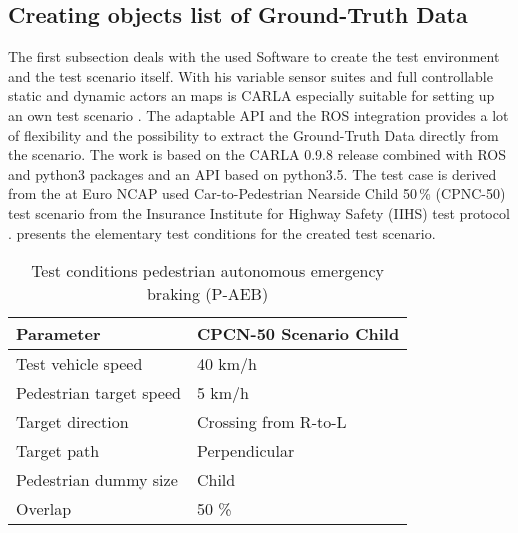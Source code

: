 
\subsection{Creating objects list of Ground-Truth Data}
The first subsection deals with the used Software to create the test environment and the test scenario itself. With his variable sensor suites and full controllable static and dynamic actors an maps is CARLA especially suitable for setting up an own test scenario \cite{Dosovitskiy17}. The adaptable \ac{API} and the \ac{ROS} integration provides a lot of flexibility and the possibility to extract the Ground-Truth Data directly from the scenario. The work is based on the CARLA 0.9.8 release combined with \ac{ROS} and python3 packages and an \ac{API} based on python3.5. The test case is derived from the at Euro NCAP used Car-to-Pedestrian Nearside Child 50\,\% (CPNC-50) test scenario from the Insurance Institute for Highway Safety (IIHS) test protocol \cite{NCAP, Protocoll}.  presents the elementary test conditions for the created test scenario. %


\begin{table}[h]
	\caption{Test conditions pedestrian autonomous emergency braking (P-AEB) \cite{Protocoll}}
	\label{Test conditions}
	\begin{center}
		\begin{tabular}{l l}
			\hline
			Parameter & CPCN-50 Scenario Child\\
			\hline
			Test vehicle speed & 40 km/h\\
			Pedestrian target speed & 5 km/h\\
			Target direction        & Crossing from R-to-L\\
			Target path             & Perpendicular\\
			Pedestrian dummy size   & Child\\
			Overlap                 & 50 \%\\
			\hline
			
			
		\end{tabular}
	\end{center}
\end{table}



